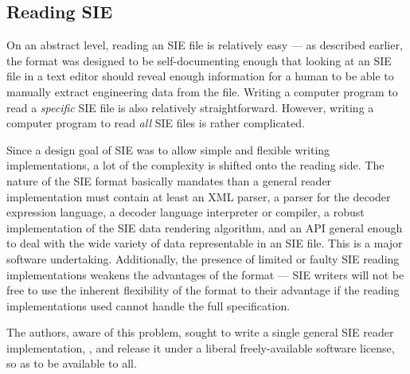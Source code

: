 \documentclass{article}
\begin{document}


\subsection{Reading SIE}

On an abstract level, reading an SIE file is relatively easy --- as
described earlier, the format was designed to be self-documenting
enough that looking at an SIE file in a text editor should reveal
enough information for a human to be able to manually extract
engineering data from the file.  Writing a computer program to read a
\emph{specific} SIE file is also relatively straightforward.  However,
writing a computer program to read \emph{all} SIE files is rather
complicated.

Since a design goal of SIE was to allow simple and flexible writing
implementations, a lot of the complexity is shifted onto the reading
side.  The nature of the SIE format basically mandates than a general
reader implementation must contain at least an XML parser, a parser
for the decoder expression language, a decoder language interpreter or
compiler, a robust implementation of the SIE data rendering algorithm,
and an API general enough to deal with the wide variety of data
representable in an SIE file.  This is a major software undertaking.
Additionally, the presence of limited or faulty SIE reading
implementations weakens the advantages of the format --- SIE writers
will not be free to use the inherent flexibility of the format to
their advantage if the reading implementations used cannot handle the
full specification.

The authors, aware of this problem, sought to write a single general
SIE reader implementation, \libsie{},  and release it under a liberal
freely-available software license, so as to be available to all.


\end{document}
